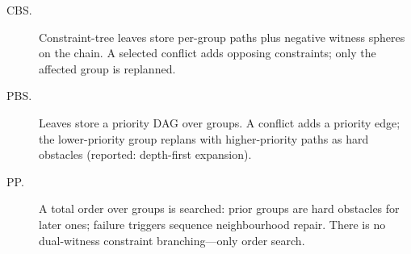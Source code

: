 \begin{description}
  \item[CBS.]
  Constraint-tree leaves store per-group paths plus negative witness spheres on
  the chain.
  A selected conflict adds opposing constraints; only the affected group is
  replanned.

  \item[PBS.]
  Leaves store a priority DAG over groups.
  A conflict adds a priority edge; the lower-priority group replans with
  higher-priority paths as hard obstacles
  (reported: depth-first expansion).

  \item[PP.]
  A total order over groups is searched: prior groups are hard obstacles for
  later ones; failure triggers sequence neighbourhood repair.
  There is no dual-witness constraint branching---only order search.
\end{description}
